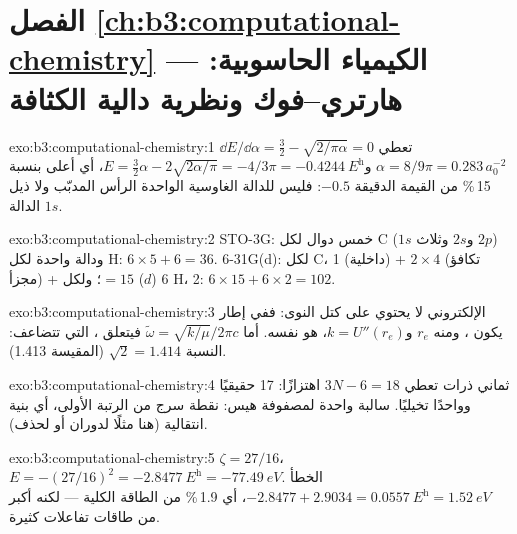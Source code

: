 \section*{الفصل \ref{ch:b3:computational-chemistry} --- الكيمياء الحاسوبية: هارتري--فوك ونظرية دالية الكثافة}

\begin{solution}{exo:b3:computational-chemistry:1}
$\dd E/\dd\alpha = \frac32 - \sqrt{2/\pi\alpha} = 0$ تعطي $\alpha = 8/9\pi = 0.283\,
a_0^{-2}$ و$E = \frac32\alpha - 2\sqrt{2\alpha/\pi} = -4/3\pi = \qty{-0.4244}{\hartree}$،
أي أعلى بنسبة 15\,\% من القيمة الدقيقة $-0.5$: فليس للدالة الغاوسية الواحدة الرأس المدبّب ولا
ذيل الدالة $1s$.
\end{solution}

\begin{solution}{exo:b3:computational-chemistry:2}
STO-3G: خمس دوال لكل C ($1s$ و$2s$ وثلاث $2p$) ودالة واحدة لكل H: $6 \times 5 + 6 =
36$. 6-31G(d): لكل C، 1 (داخلية) + $2 \times 4$ (تكافؤ مجزأ) + 6 ($d$) $= 15$؛
ولكل H، 2: $6 \times 15 + 6 \times 2 = 102$.
\end{solution}

\begin{solution}{exo:b3:computational-chemistry:3}
 الإلكتروني لا يحتوي على كتل النوى: ففي إطار
 يكون ، ومنه $r_e$ و$k = U''(r_e)$، هو
نفسه. أما $\tilde\omega = \sqrt{k/\mu}/2\pi c$ فيتعلق ، التي
تتضاعف: النسبة $\sqrt2 = 1.414$ (المقيسة 1.413).
\end{solution}

\begin{solution}{exo:b3:computational-chemistry:4}
ثماني ذرات تعطي $3N - 6 = 18$ اهتزازًا: 17 حقيقيًا وواحدًا تخيليًا. 
سالبة واحدة لمصفوفة هيس: نقطة سرج من الرتبة الأولى، أي بنية
انتقالية (هنا مثلًا لدوران أو لحذف).
\end{solution}

\begin{solution}{exo:b3:computational-chemistry:5}
$\zeta = 27/16$، $E = -(27/16)^2 = \qty{-2.8477}{\hartree} = \qty{-77.49}{eV}$.
الخطأ $-2.8477 + 2.9034 = \qty{0.0557}{\hartree} = \qty{1.52}{eV}$، أي
1.9\,\% من الطاقة الكلية --- لكنه أكبر من طاقات تفاعلات كثيرة.
\end{solution}

